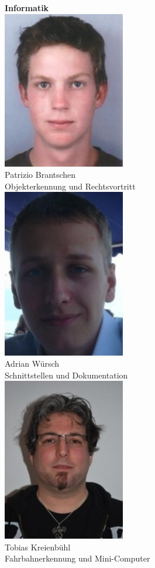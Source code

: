 \begin{minipage}{0.49\textwidth}
\begin{flushright} \large
\textbf{Informatik}\\[2ex]
\includegraphics[width=0.4\textwidth]{./04_Projektmanagement/fig/patriziobrantschen.jpg}\\
Patrizio Brantschen\\
Objekterkennung und Rechtsvortritt\\[2ex]
\includegraphics[width=0.4\textwidth]{./04_Projektmanagement/fig/adrianwuersch.jpg}\\
Adrian Würsch\\
Schnittstellen und Dokumentation\\[2ex]
\includegraphics[width=0.4\textwidth]{./04_Projektmanagement/fig/tobiaskreienbuehl.jpg}\\
Tobias Kreienbühl\\
Fahrbahnerkennung und Mini-Computer\\[2ex]
\end{flushright}
\end{minipage}









